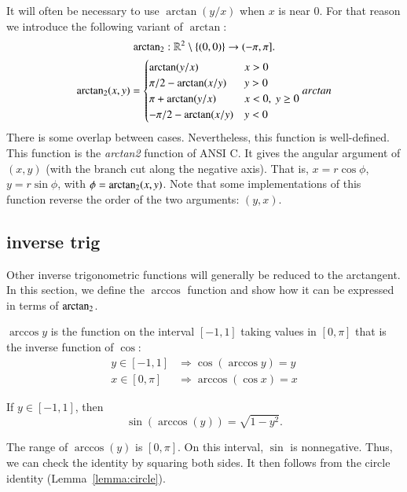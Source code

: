 It will often be necessary to use $\arctan(y/x)$ when $x$ is near $0$.
For that reason we introduce the following variant of $\arctan$:
$$
{\operatorname{arctan_2}}: \mathbb{R}^2\setminus\{(0,0)\} \to (-\pi,\pi].
$$
$$
\atn(x,y) = \begin{cases}
   \arctan(y/x) & x > 0\\
   \pi/2- \arctan(x/y) & y > 0 \\
   \pi + \arctan(y/x) & x< 0,\  y\ge 0\\
   -\pi/2- \arctan(x/y) & y< 0 \\
\end{cases}
\indy{Index}{arctan}
$$
There is some overlap between cases. Nevertheless, 
this function is well-defined.  
This function is the {\it arctan2} function of ANSI C.  It gives the
angular argument of $(x,y)$ (with the branch cut along the negative axis).
That is, $x = r\cos\phi$, $y=r\sin\phi$, with $\phi={\operatorname{arctan_2}}(x,y)$.
Note that some implementations of this function reverse the order of the two arguments: $(y,x)$.


\subsection{inverse trig}
Other inverse trigonometric functions will generally be reduced to
the arctangent.  In this section, we define the $\arccos$ function and show how it can be expressed in terms of ${\operatorname{arctan_2}}$.

\begin{definition}[arccos]\label{def:arccos}
$\arccos y$ is the function on the interval $[-1,1]$
taking values in $[0,\pi]$ that is the inverse function of $\cos$:
    $$\begin{array}{lll}
        y\in [-1,1] &\Rightarrow \cos(\arccos y) = y\\
        x\in[0,\pi] &\Rightarrow \arccos(\cos x) = x
    \end{array}$$
\end{definition}

\begin{lemma}\label{lemma:sin-arccos} 
If $y\in[-1,1]$, then
    $$\sin(\arccos(y)) = \sqrt{1-y^2}.$$
\end{lemma}

\begin{proved}
    The range of $\arccos(y)$ is $[0,\pi]$.  On this interval, $\sin$
    is nonnegative.  Thus, we can check the identity by squaring
    both sides.  It then follows from the circle identity
    (Lemma~\ref{lemma:circle}).
\swallowed\end{proved}


